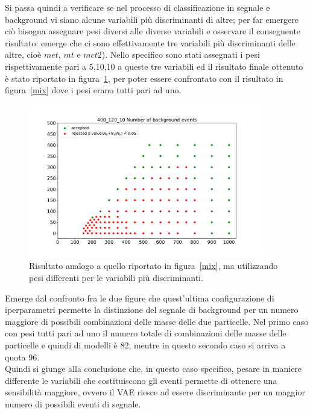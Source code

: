 \newpage

Si passa quindi a verificare se nel processo di classificazione in segnale e background vi siano alcune variabili più discriminanti di altre; per far emergere ciò bisogna assegnare pesi diversi alle diverse variabili e osservare il conseguente risultato: emerge che ci sono effettivamente tre variabili più discriminanti delle altre, cioè $\textit{met}$, $\textit{mt}$ e $\textit{mct2}$). Nello specifico sono stati assegnati i pesi rispettivamente pari a 5,10,10 a queste tre variabili ed il risultato finale ottenuto è stato riportato in figura~\ref{mix_ottimizzato}, per poter essere confrontato con il risultato in figura~\ref{mix} dove i pesi erano tutti pari ad uno.

\begin{figure}[h!]
	\centering
	\includegraphics[width=0.90\textwidth]{figs/risultati_simulazione/mix_ottimizzato.pdf}
	\caption{Risultato analogo a quello riportato in figura~\ref{mix}, ma utilizzando pesi differenti per le variabili più discriminanti.}
	\label{mix_ottimizzato}
\end{figure}

Emerge dal confronto fra le due figure che quest'ultima configurazione di iperparametri permette la distinzione del segnale di background per un numero maggiore di possibili combinazioni delle masse delle due particelle. Nel primo caso con pesi tutti pari ad uno il numero totale di combinazioni delle masse delle particelle e quindi di modelli è 82, mentre in questo secondo caso si arriva a quota 96. \\
Quindi si giunge alla conclusione che, in questo caso specifico, pesare in maniere differente le variabili che costituiscono gli eventi permette di ottenere una sensibilità maggiore, ovvero il VAE riesce ad essere discriminante per un maggior numero di possibili eventi di segnale.

